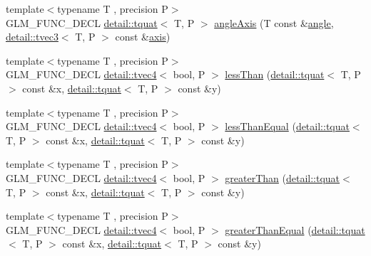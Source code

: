 \begin{DoxyCompactItemize}
\item 
{\footnotesize template$<$typename T , precision P$>$ }\\G\+L\+M\+\_\+\+F\+U\+N\+C\+\_\+\+D\+E\+CL \hyperlink{structglm_1_1detail_1_1tquat}{detail\+::tquat}$<$ T, P $>$ \hyperlink{group__gtc__quaternion_ga771b3e16cca8324e7111b923476be666}{angle\+Axis} (T const \&\hyperlink{group__gtc__quaternion_ga23a3fc7ada5bbb665ff84c92c6e0542c}{angle}, \hyperlink{structglm_1_1detail_1_1tvec3}{detail\+::tvec3}$<$ T, P $>$ const \&\hyperlink{group__gtc__quaternion_ga8eef9f8c3f2e4836dccf09df975b20fb}{axis})
\item 
{\footnotesize template$<$typename T , precision P$>$ }\\G\+L\+M\+\_\+\+F\+U\+N\+C\+\_\+\+D\+E\+CL \hyperlink{structglm_1_1detail_1_1tvec4}{detail\+::tvec4}$<$ bool, P $>$ \hyperlink{group__gtc__quaternion_ga4e4c37b86cecde7e1076c5b5fdb920b9}{less\+Than} (\hyperlink{structglm_1_1detail_1_1tquat}{detail\+::tquat}$<$ T, P $>$ const \&x, \hyperlink{structglm_1_1detail_1_1tquat}{detail\+::tquat}$<$ T, P $>$ const \&y)
\item 
{\footnotesize template$<$typename T , precision P$>$ }\\G\+L\+M\+\_\+\+F\+U\+N\+C\+\_\+\+D\+E\+CL \hyperlink{structglm_1_1detail_1_1tvec4}{detail\+::tvec4}$<$ bool, P $>$ \hyperlink{group__gtc__quaternion_ga313fe20896a8cd43c6d08cc88fa18faa}{less\+Than\+Equal} (\hyperlink{structglm_1_1detail_1_1tquat}{detail\+::tquat}$<$ T, P $>$ const \&x, \hyperlink{structglm_1_1detail_1_1tquat}{detail\+::tquat}$<$ T, P $>$ const \&y)
\item 
{\footnotesize template$<$typename T , precision P$>$ }\\G\+L\+M\+\_\+\+F\+U\+N\+C\+\_\+\+D\+E\+CL \hyperlink{structglm_1_1detail_1_1tvec4}{detail\+::tvec4}$<$ bool, P $>$ \hyperlink{group__gtc__quaternion_ga63be67bccef0b0ad4e60656223ab3761}{greater\+Than} (\hyperlink{structglm_1_1detail_1_1tquat}{detail\+::tquat}$<$ T, P $>$ const \&x, \hyperlink{structglm_1_1detail_1_1tquat}{detail\+::tquat}$<$ T, P $>$ const \&y)
\item 
{\footnotesize template$<$typename T , precision P$>$ }\\G\+L\+M\+\_\+\+F\+U\+N\+C\+\_\+\+D\+E\+CL \hyperlink{structglm_1_1detail_1_1tvec4}{detail\+::tvec4}$<$ bool, P $>$ \hyperlink{group__gtc__quaternion_gac90d5af34a03cd665a349ac30e4cc44c}{greater\+Than\+Equal} (\hyperlink{structglm_1_1detail_1_1tquat}{detail\+::tquat}$<$ T, P $>$ const \&x, \hyperlink{structglm_1_1detail_1_1tquat}{detail\+::tquat}$<$ T, P $>$ const \&y)

\end{DoxyCompactItemize}
